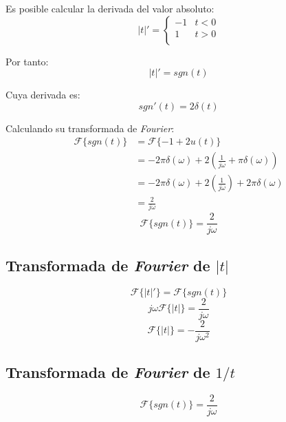 Es posible calcular la derivada del valor absoluto:
\begin{equation*}
    |t|'=\begin{cases}
        -1 & t<0\\
        1 & t>0\\
    \end{cases}
\end{equation*}

Por tanto:
\begin{equation}
    |t|'=sgn(t)
\end{equation}

Cuya derivada es:
\begin{equation}
    sgn'(t)=2\delta(t)
\end{equation}

Calculando su transformada de \emph{Fourier}:
\begin{equation*}
\begin{split}
    \mathcal{F}\{sgn(t)\}
        &=\mathcal{F}\{-1+2u(t)\}\\
        &=-2\pi\delta(\omega)
            +2\left(\frac{1}{j\omega}+\pi\delta(\omega)\right)\\
        &=-2\pi\delta(\omega)
            +2\left(\frac{1}{j\omega}\right)+2\pi\delta(\omega)\\
        &=\frac{2}{j\omega}
\end{split}
\end{equation*}
\begin{equation}
    \mathcal{F}\{sgn(t)\}=\frac{2}{j\omega}
\end{equation}

\subsection{Transformada de \emph{Fourier} de $|t|$}
\begin{equation*}
    \mathcal{F}\{|t|'\}=\mathcal{F}\{sgn(t)\}
\end{equation*}
\begin{equation*}
    j\omega\mathcal{F}\{|t|\}=\frac{2}{j\omega}
\end{equation*}
\begin{equation}
    \mathcal{F}\{|t|\}=-\frac{2}{j\omega^2}
\end{equation}

\subsection{Transformada de \emph{Fourier} de $1/t$}
\begin{equation*}
    \mathcal{F}\{sgn(t)\}=\frac{2}{j\omega}
\end{equation*}

